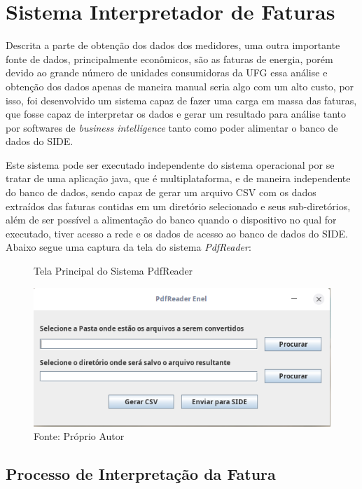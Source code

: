 \chapter{Sistema Interpretador de Faturas} 
\label{c:sistema_interpretador_de_faturas}
Descrita a parte de obtenção dos dados dos medidores, uma outra importante fonte de dados, principalmente econômicos, são as faturas de energia, porém devido ao grande número de unidades consumidoras da UFG essa análise e obtenção dos dados apenas de maneira manual seria algo com um alto custo, por isso, foi desenvolvido um sistema capaz de fazer uma carga em massa das faturas, que fosse capaz de interpretar os dados e gerar um resultado para análise tanto por softwares de \textit{business intelligence} tanto como poder alimentar o banco de dados do SIDE.

Este sistema pode ser executado independente do sistema operacional por se tratar de uma aplicação java, que é multiplataforma, e de maneira independente do banco de dados, sendo capaz de gerar um arquivo CSV com os dados extraídos das faturas contidas em um diretório selecionado e seus sub-diretórios, além de ser possível a alimentação do banco quando o dispositivo no qual for executado, tiver acesso a rede e os dados de acesso ao banco de dados do SIDE. Abaixo segue uma captura da tela do sistema \textit{PdfReader}:

\begin{figure}[H]
    \centering
    \caption{Tela Principal do Sistema PdfReader}
\includegraphics[width=\linewidth]{imagens/pdf-reader.png}
    \caption*{Fonte: Próprio Autor}
    \label{fig:pdf-reader}
\end{figure}

\newpage
\section{Processo de Interpretação da Fatura}

